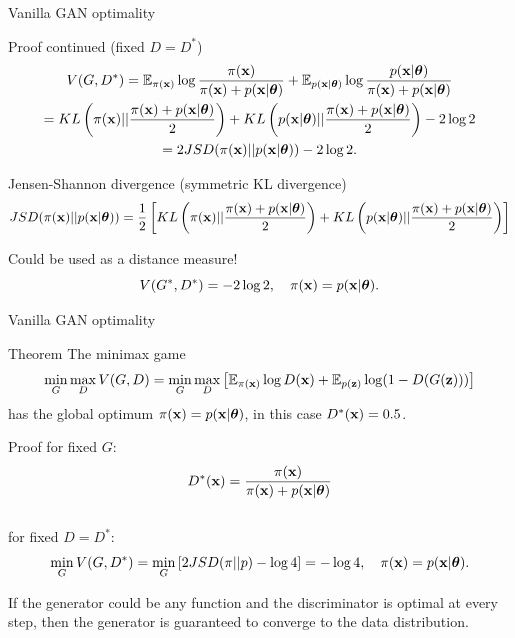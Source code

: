 \begin{frame}{Vanilla GAN optimality}
	\begin{block}{Proof continued (fixed $D = D^*$)}
		\vspace{-0.5cm}
		\begin{multline*}
			V(G, D^*) = \mathbb{E}_{\pi(\mathbf{x})} \log \frac{\pi(\mathbf{x})}{\pi(\mathbf{x}) + p(\mathbf{x} | \boldsymbol{\theta})} + \mathbb{E}_{p(\mathbf{x} | \boldsymbol{\theta})} \log \frac{p(\mathbf{x} | \boldsymbol{\theta})}{\pi(\mathbf{x}) + p(\mathbf{x} | \boldsymbol{\theta})} \\
		 = KL \left(\pi(\mathbf{x}) || \frac{\pi(\mathbf{x}) + p(\mathbf{x} | \boldsymbol{\theta})}{2}\right) + KL \left(p(\mathbf{x} | \boldsymbol{\theta}) || \frac{\pi(\mathbf{x}) + p(\mathbf{x} | \boldsymbol{\theta})}{2}\right) - 2\log 2 \\
		 = 2JSD(\pi(\mathbf{x}) || p(\mathbf{x} | \boldsymbol{\theta})) - 2\log 2.
		\end{multline*}
	\end{block}
	\vspace{-0.3cm}
	\begin{block}{Jensen-Shannon divergence (symmetric KL divergence)}
		\vspace{-0.2cm}
		\footnotesize
		\[
			JSD(\pi(\mathbf{x}) || p(\mathbf{x} | \boldsymbol{\theta})) = \frac{1}{2} \left[KL \left(\pi(\mathbf{x}) || \frac{\pi(\mathbf{x}) + p(\mathbf{x} | \boldsymbol{\theta})}{2}\right) + KL \left(p(\mathbf{x} | \boldsymbol{\theta}) || \frac{\pi(\mathbf{x}) + p(\mathbf{x} | \boldsymbol{\theta})}{2}\right) \right]
		\]
	\end{block}
	Could be used as a distance measure!
	\[
		V(G^*, D^*) = -2\log 2, \quad \pi(\mathbf{x}) = p(\mathbf{x} | \boldsymbol{\theta}).
	\]
	
\end{frame}
\begin{frame}{Vanilla GAN optimality}
	\begin{block}{Theorem}
		The minimax game 
		\vspace{-0.1cm}
		\[
			\min_{G} \max_D  V(G, D) = \min_{G} \max_D \left[ \mathbb{E}_{\pi(\mathbf{x})} \log D(\mathbf{x}) + \mathbb{E}_{p(\mathbf{z})} \log (1 - D(G(\mathbf{z}))) \right]
		\]
		has the global optimum $\pi(\mathbf{x}) = p(\mathbf{x} | \boldsymbol{\theta})$, in this case $D^*(\mathbf{x}) = 0.5$.
	\end{block}
	\vspace{-0.2cm}
	\begin{block}{Proof}
	for fixed $G$:
	\[
		D^*(\mathbf{x}) = \frac{\pi(\mathbf{x})}{\pi(\mathbf{x}) + p(\mathbf{x} | \boldsymbol{\theta})}
	\]
	\vspace{-0.5cm} \\
	for fixed $D = D^*$:
	\[
		\min_{G} V(G, D^*) = \min_{G} \left[ 2 JSD(\pi || p) - \log 4 \right] = -\log 4, \quad \pi(\mathbf{x}) = p(\mathbf{x} | \boldsymbol{\theta}).
	\]
	\vspace{-0.6cm}
	\end{block}
	If the generator could be any function and the discriminator is optimal at every step, then the generator is guaranteed to converge to the data distribution.
\end{frame}
